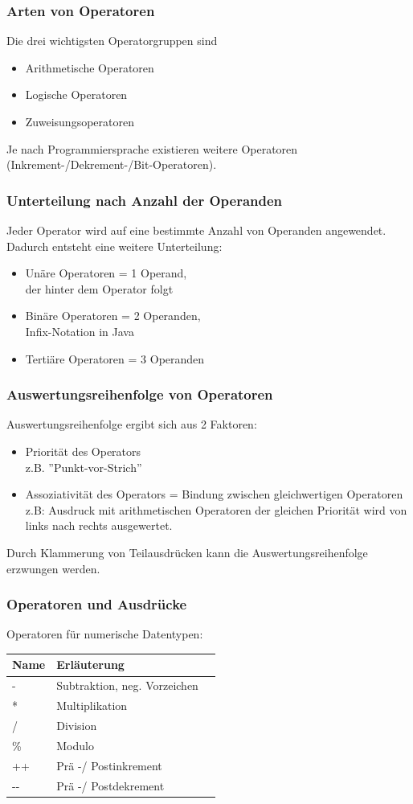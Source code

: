 \begin{frame}[fragile]
	\frametitle{Arten von Operatoren}
	Die drei wichtigsten Operatorgruppen sind
	\begin{itemize}
	  \item Arithmetische Operatoren
	  \item Logische Operatoren
	  \item Zuweisungsoperatoren
	\end{itemize}
	Je nach Programmiersprache existieren weitere Operatoren
	(Inkrement-/Dekrement-/Bit-Operatoren).
\end{frame}

\begin{frame}[fragile]
	\frametitle{Unterteilung nach Anzahl der Operanden}
	Jeder Operator wird auf eine bestimmte Anzahl von Operanden angewendet. 
	Dadurch entsteht eine weitere Unterteilung:
	\begin{itemize}
	  \item Unäre Operatoren = 1 Operand, \\der hinter dem Operator folgt
	  \item Binäre Operatoren = 2 Operanden, \\Infix-Notation in Java
	  \item Tertiäre Operatoren = 3 Operanden
	\end{itemize}
\end{frame}

\begin{frame}[fragile]
	\frametitle{Auswertungsreihenfolge von Operatoren}
	Auswertungsreihenfolge ergibt sich aus 2 Faktoren:
	\begin{itemize}
	  \item Priorität des Operators\\
	  z.B. ''Punkt-vor-Strich''
	  \item Assoziativität des Operators = Bindung zwischen gleichwertigen
	  Operatoren\\
	  z.B: Ausdruck mit arithmetischen Operatoren der gleichen
	  Priorität wird von links nach rechts ausgewertet.
	\end{itemize}
	Durch Klammerung von Teilausdrücken kann die Auswertungsreihenfolge
	erzwungen werden.
\end{frame}

\begin{frame}[fragile]
	\frametitle{Operatoren und Ausdr\"ucke}
	Operatoren f\"ur numerische Datentypen:
	\begin{table}
	\begin{tabular}{l|l|l}
	Name & Erl\"auterung \\ \hline
			- & Subtraktion, neg. Vorzeichen \\
			* & Multiplikation \\
			/ & Division \\
			\% & Modulo \\
			++ & Pr\"a -/ Postinkrement \\
			-{}- & Pr\"a -/ Postdekrement \\
	\end{tabular}
	\end{table}
\end{frame}

